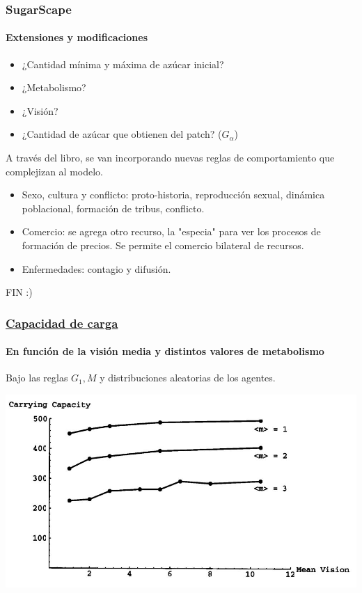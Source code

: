 \documentclass[11pt]{beamer}
\begin{document}
\begin{frame}
\frametitle{SugarScape}
\framesubtitle{Extensiones y modificaciones}


\begin{itemize}
	\item ¿Cantidad mínima y máxima de azúcar inicial?
	\item ¿Metabolismo?
	\item ¿Visión?
	\item ¿Cantidad de azúcar que obtienen del patch? ($G_{\alpha}$)
\end{itemize}

\vspace{3mm}
A través del libro, se van incorporando nuevas reglas de comportamiento que complejizan al modelo.

\begin{itemize}
	\item Sexo, cultura y conflicto: proto-historia, reproducción sexual, dinámica poblacional, formación de tribus, conflicto.
	\item Comercio: se agrega otro recurso, la "especia" para ver los procesos de formación de precios. Se permite el comercio bilateral de recursos.
	\item Enfermedades: contagio y difusión.
\end{itemize}
\end{frame}

\begin{frame}
	FIN :)
\end{frame}

\begin{frame}
	\label{carry-cap}
	\frametitle{\hyperlink{g-inf}{Capacidad de carga}}
	\framesubtitle{En función de la visión media y distintos valores de metabolismo}

	Bajo las reglas $G_{1},M$ y distribuciones aleatorias de los agentes.
	\vspace{3mm}
	
	\includegraphics[width=1\linewidth]{figuras/carry_capacity.JPG}

	

\end{frame}
\end{document}
